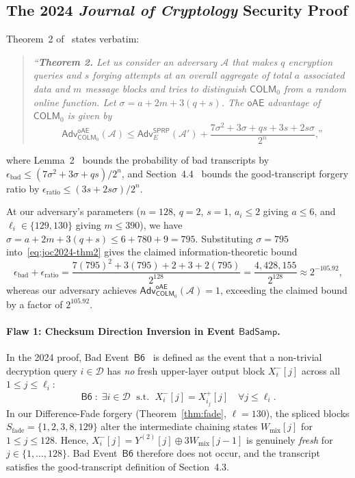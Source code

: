 \documentclass[11pt,a4paper]{article}
\theoremstyle{definition}
\theoremstyle{remark}
\newcommand{\COLMzero}{\mathsf{COLM}_0}
\newcommand{\Adv}{\mathsf{Adv}}
\begin{document}
\subsection{The 2024 \emph{Journal of Cryptology} Security Proof}
Theorem~2 of~\cite[Section~4, p.~15]{COLM24} states verbatim:
\begin{quote}
\itshape
``\textbf{Theorem 2.} Let us consider an adversary $\mathcal{A}$ that makes $q$ encryption queries and $s$ forging attempts at an overall aggregate of total $a$ associated data and $m$ message blocks and tries to distinguish $\COLMzero$ from a random online function. Let $\sigma = a + 2m + 3(q + s)$. The $\mathsf{oAE}$ advantage of $\COLMzero$ is given by
\begin{equation}
\label{eq:joc2024-thm2}
\Adv^{\mathsf{oAE}}_{\COLMzero}(\mathcal{A}) \le \Adv^{\mathsf{SPRP}}_E(\mathcal{A}') + \frac{7\sigma^2 + 3\sigma + qs + 3s + 2s\sigma}{2^n}\text{,''}
\end{equation}
\end{quote}
where Lemma~2~\cite[p.~23]{COLM24} bounds the probability of bad transcripts by $\epsilon_{\mathrm{bad}} \le (7\sigma^2 + 3\sigma + qs)/2^n$, and Section~4.4~\cite[pp.~24--25]{COLM24} bounds the good-transcript forgery ratio by $\epsilon_{\mathrm{ratio}} \le (3s + 2s\sigma)/2^n$.

At our adversary's parameters ($n = 128$, $q = 2$, $s = 1$, $a_i \le 2$ giving $a \le 6$, and $\ell_i \in \{129, 130\}$ giving $m \le 390$), we have $\sigma = a + 2m + 3(q + s) \le 6 + 780 + 9 = 795$. Substituting $\sigma = 795$ into~\eqref{eq:joc2024-thm2} gives the claimed information-theoretic bound
\begin{equation}
\label{eq:joc2024-eval}
\epsilon_{\mathrm{bad}} + \epsilon_{\mathrm{ratio}} = \frac{7(795)^2 + 3(795) + 2 + 3 + 2(795)}{2^{128}} = \frac{4{,}428{,}155}{2^{128}} \approx 2^{-105.92},
\end{equation}
whereas our adversary achieves $\Adv^{\mathsf{oAE}}_{\COLMzero}(\mathcal{A}) = 1$, exceeding the claimed bound by a factor of $2^{105.92}$.

\paragraph{Flaw 1: Checksum Direction Inversion in Event $\mathsf{BadSamp}$.}
In the 2024 proof, Bad Event~$\mathsf{B6}$~\cite[p.~22]{COLM24} is defined as the event that a non-trivial decryption query $i \in \mathcal{D}$ has \emph{no} fresh upper-layer output block $X_i^-[j]$ across all $1 \le j \le \ell_i$:
\begin{equation}
\mathsf{B6} \;:\; \exists i \in \mathcal{D} \;\text{ s.t. }\; X_i^-[j] = X_{i_j}^+[j] \quad \forall j \le \ell_i.
\end{equation}
In our Difference-Fade forgery (Theorem~\ref{thm:fade}, $\ell = 130$), the spliced blocks $S_{\mathrm{fade}} = \{1, 2, 3, 8, 129\}$ alter the intermediate chaining states $W_{\mathrm{mix}}[j]$ for $1 \le j \le 128$. Hence, $X_i^-[j] = Y^{(2)}[j] \oplus 3W_{\mathrm{mix}}[j-1]$ is genuinely \emph{fresh} for $j \in \{1, \dots, 128\}$. Bad Event~$\mathsf{B6}$ therefore does not occur, and the transcript satisfies the good-transcript definition of Section~4.3.
\end{document}
